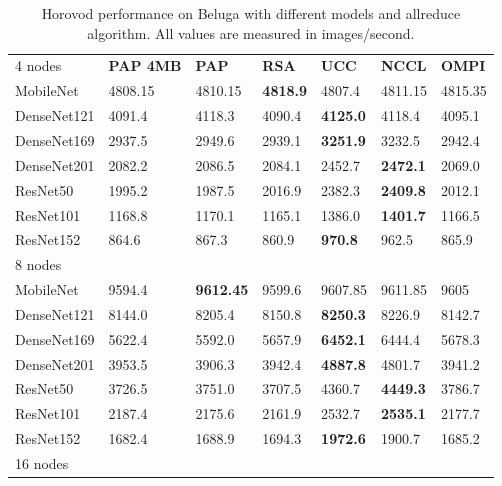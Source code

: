 \begin{table}
    \centering
    \caption{
        Horovod performance on Beluga with different models and allreduce algorithm.
        All values are measured in images/second.
    }
    \begin{tabular}{lllllll}
     4 nodes    & \textbf{PAP 4MB} & \textbf{PAP} & \textbf{RSA} & \textbf{UCC} & \textbf{NCCL} & \textbf{OMPI} \\
    MobileNet   &    4808.15 &    4810.15   &    \textbf{4818.9}  &    4807.4  &    4811.15  &    4815.35  \\
    DenseNet121 & 4091.4    & 4118.3       & 4090.4  & \textbf{4125.0}    & 4118.4  & 4095.1  \\
    DenseNet169 & 2937.5    & 2949.6       & 2939.1  & \textbf{3251.9}  & 3232.5  & 2942.4  \\
    DenseNet201 & 2082.2    & 2086.5       & 2084.1  & 2452.7  & \textbf{2472.1}  & 2069.0    \\
    ResNet50    & 1995.2    & 1987.5       & 2016.9  & 2382.3  & \textbf{2409.8}  & 2012.1  \\
    ResNet101   & 1168.8    & 1170.1       & 1165.1  & 1386.0    & \textbf{1401.7}  & 1166.5  \\
    ResNet152   & 864.6     & 867.3        & 860.9   & \textbf{970.8}   & 962.5   & 865.9   \\ \hline
    8 nodes     & ~         & ~            & ~       & ~       & ~       & ~       \\
    MobileNet   &    9594.4  &    \textbf{9612.45}   &    9599.6  &    9607.85 &    9611.85  &    9605     \\
    DenseNet121 & 8144.0      & 8205.4       & 8150.8  & \textbf{8250.3}  & 8226.9  & 8142.7  \\
    DenseNet169 & 5622.4    & 5592.0         & 5657.9  & \textbf{6452.1}  & 6444.4  & 5678.3  \\
    DenseNet201 & 3953.5    & 3906.3       & 3942.4  & \textbf{4887.8}  & 4801.7  & 3941.2  \\
    ResNet50    & 3726.5    & 3751.0         & 3707.5  & 4360.7  & \textbf{4449.3}  & 3786.7  \\
    ResNet101   & 2187.4    & 2175.6       & 2161.9  & 2532.7  & \textbf{2535.1}  & 2177.7  \\
    ResNet152   & 1682.4    & 1688.9       & 1694.3  & \textbf{1972.6}  & 1900.7  & 1685.2  \\ \hline
    16 nodes    & ~         & ~            & ~       & ~       & ~       & ~       \\

\end{tabular}
\end{table}
